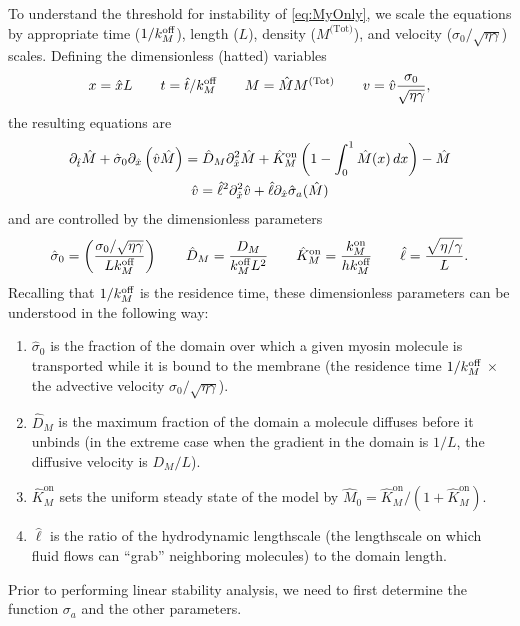 \documentclass[11pt]{article}
\newcommand{\6}[1]{#1_{\text{6}}}
\newcommand{\3}[1]{#1_{\text{3}}}
\newcommand{\Tot}[1]{#1^\text{(Tot)}}
\newcommand{\My}[1]{#1_M}
\begin{document}
To understand the threshold for instability of \eqref{eq:MyOnly}, we scale the equations by appropriate time ($1/\My{\koff}$), length ($L$), density ($\Tot{M}$), and velocity ($\sigma_0/\sqrt{\eta \gamma}$) scales. Defining the dimensionless (hatted) variables
\begin{equation}
\label{eq:NDD}
x = \hat{x} L \qquad t= \hat{t}/\My{\koff} \qquad M= \hat{M}\Tot{M} \qquad v = \hat{v} \frac{\sigma_0}{\sqrt{\eta \gamma}},
\end{equation}
the resulting equations are 
\begin{subequations}
\label{eq:MyosinEqs}
\begin{gather}
\label{eq:MND}
\partial_{\hat{t}} \hat{M} +\hat{\sigma}_0  \partial_{\hat{x}} \left(\hat{v} \hat{M} \right) =\hat{D}_M \partial_{\hat{x}}^2 \hat{M} +\hat{K}^\text{on}_M \left(1-\int_0^1  \hat{M}(x) \, dx\right) - \hat{M}\\
\label{eq:MVND}
\hat{v} = \hat{\ell}^2 \partial_{\hat{x}}^2 \hat v +\hat{\ell} \partial_{\hat{x}} \hat{\sigma}_a(\hat{M})
 \end{gather}
\end{subequations}
and are controlled by the dimensionless parameters 
\begin{equation}
\label{eq:NDparams}
\hat{\sigma}_0 = \left(\frac{\sigma_0/ \sqrt{\eta \gamma} }{L \My{\koff}}\right)   \qquad \hat{D}_M =\frac{D_M}{\My{\koff}  L^2} \qquad \hat{K}^\text{on}_M= \frac{\My{\kon}}{h \My{\koff}} \qquad \hat{\ell} = \frac{\sqrt{\eta/\gamma}}{L}.
\end{equation}
Recalling that $1/\My{\koff}$ is the residence time, these dimensionless parameters can be understood in the following way: 
\begin{enumerate}
\item $\hat{\sigma}_0$ is the fraction of the domain over which a given myosin molecule is transported while it is bound to the membrane (the residence time $1/\My{\koff}$ $\times$ the advective velocity $\sigma_0 / \sqrt{\eta \gamma}$).
\item $\hat{D}_M$ is the maximum fraction of the domain a molecule diffuses before it unbinds (in the extreme case when the gradient in the domain is $1/L$, the diffusive velocity is $D_M/L$). 
\item $\hat{K}^\text{on}_M$ sets the uniform steady state of the model by $\hat{M}_0= \hat{K}^\text{on}_M/\left(1+\hat{K}^\text{on}_M\right)$.
\item $\hat{\ell}$ is the ratio of the hydrodynamic lengthscale (the lengthscale on which fluid flows can ``grab'' neighboring molecules) to the domain length.
\end{enumerate}
Prior to performing linear stability analysis, we need to first determine the function $\sigma_a$ and the other parameters. 
\end{document}
